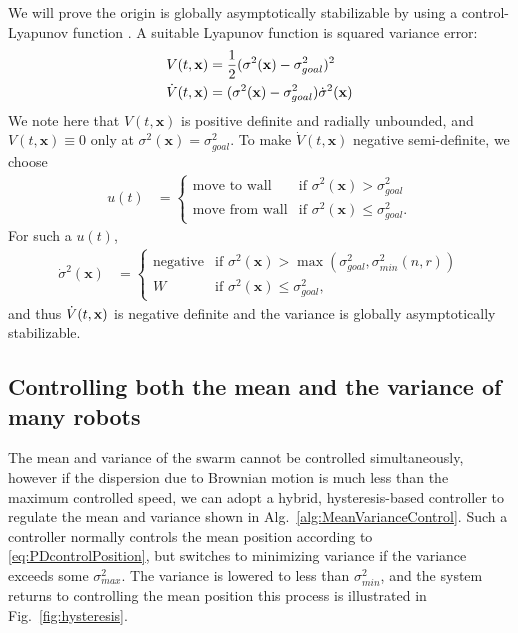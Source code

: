 We will prove the origin is globally asymptotically stabilizable by using a control-Lyapunov function \cite{Lyapunov1992}.  A suitable Lyapunov function is squared variance error:
\begin{align}
\label{eq:LyapunovVariance}
V(t,\bf{x})  &= \frac{1}{2} (\sigma^2(\mathbf{x}) - \sigma^2_{goal})^2\\
\dot{V}(t,\bf{x}) &= (\sigma^2(\mathbf{x})-\sigma^2_{goal})\dot{\sigma}^2(\mathbf{x})
\end{align}
We note here that $V(t,\mathbf{x})$ is positive definite and radially unbounded, and $V(t,\mathbf{x}) \equiv 0$ only at $\sigma^2(\mathbf{x}) = \sigma^2_{goal}$.
To make $\dot{V}(t,\mathbf{x})$ negative semi-definite, we choose
\begin{align}
u(t) &=   \begin{cases}
	 \mbox{move to wall} &\mbox{if } \sigma^2(\mathbf{x})>\sigma^2_{goal} \\ 
	 \mbox{move from wall} & \mbox{if } \sigma^2(\mathbf{x}) \le \sigma^2_{goal}.
\end{cases} 
\end{align}
 For such a $u(t)$,
 \begin{align}
\dot{\sigma}^2(\mathbf{x}) &=   \begin{cases}
	 \mbox{negative} &\mbox{if } \sigma^2(\mathbf{x})> \max(\sigma^2_{goal}, \sigma^2_{min}(n,r))  \\ 
	 W & \mbox{if } \sigma^2(\mathbf{x}) \le \sigma^2_{goal},
\end{cases} 
\end{align} and thus
$\dot{V}(t,{\bf x})$ is negative definite and the variance is globally asymptotically stabilizable.





\subsection{Controlling both the mean and the variance of many robots}

The mean and variance of the swarm cannot be controlled simultaneously, however if the dispersion due to Brownian motion is much less than the maximum controlled speed, we can adopt a hybrid, hysteresis-based controller to regulate the mean and variance shown in Alg.~\ref{alg:MeanVarianceControl}.  Such a controller normally controls the mean position according to \eqref{eq:PDcontrolPosition}, but switches to minimizing variance if the variance exceeds some $\sigma_{max}^2$.  The variance is lowered to less than $\sigma_{min}^2$, and the system returns to controlling the mean position this process is illustrated in Fig.~\ref{fig:hysteresis}. 


